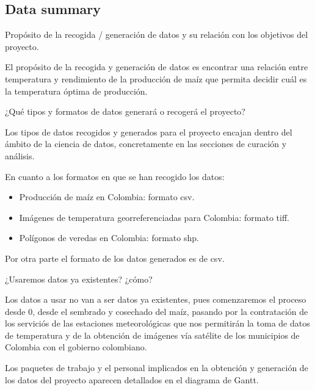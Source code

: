 \documentclass[12pt, spanish]{article}
\begin{document}
\subsection{Data summary}

\begin{shaded}
Propósito de la recogida / generación de datos y su relación con los objetivos del proyecto.
\end{shaded}

El propósito de la recogida y generación de datos es encontrar una relación entre temperatura y rendimiento de la producción de maíz que permita decidir cuál es la temperatura óptima de producción.\\

\begin{shaded}
¿Qué tipos y formatos de datos generará o recogerá  el proyecto?

\end{shaded}

Los tipos de datos recogidos  y generados para el proyecto encajan dentro del ámbito de la ciencia de datos, concretamente en las secciones de curación y análisis.

En cuanto a los formatos en que se han recogido los datos:

\begin{itemize}
    \item Producción de maíz en Colombia: formato csv.
    \item Imágenes de temperatura georreferenciadas para Colombia: formato tiff.
    \item Polígonos de veredas en Colombia: formato shp.
\end{itemize}

Por otra parte el formato de los datos generados es de csv.

\begin{shaded}
¿Usaremos datos ya existentes? ¿cómo?
\end{shaded}
Los datos a usar no van a ser datos ya existentes, pues comenzaremos el proceso desde 0, desde el sembrado y cosechado del maíz, pasando por la contratación de los serviciós de las estaciones meteorológicas  que nos permitirán la toma de datos de temperatura y de la obtención de imágenes vía satélite de los municipios de Colombia con el gobierno colombiano.

Los paquetes de trabajo y el personal implicados en la obtención y generación de los datos del proyecto aparecen detallados en el diagrama de Gantt.
\end{document}
